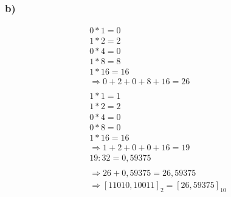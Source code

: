 \documentclass[12pt,a4paper]{article}
\begin{document}
\subsubsection*{b)}
\begin{align*}
0 * 1 = 0 \\
1 * 2 = 2 \\
0 * 4 = 0 \\
1 * 8 = 8 \\
1 * 16 = 16 \\
\Rightarrow 0 + 2 + 0 + 8 + 16 = 26 \\
\\
1 * 1 = 1 \\
1 * 2 = 2 \\
0 * 4 = 0 \\
0 * 8 = 0 \\
1 * 16 = 16 \\
\Rightarrow 1 + 2 + 0 + 0 + 16 = 19 \\
19 : 32 = 0,59375\\
\\
\Rightarrow 26 + 0,59375 = 26,59375 \\
\Rightarrow [11010,10011]_{2} = [26,59375]_{10}
\end{align*}
\end{document}
